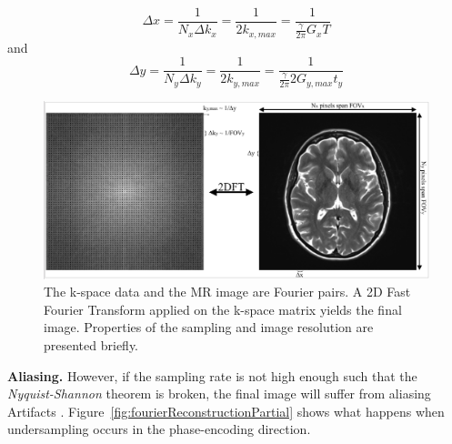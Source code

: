 \begin{equation} \label{eq:1212}
    \Delta x = \frac{1}{N_x \Delta k_x} = \frac{1}{2 k_{x,max}} = \frac{1}{\frac{\gamma}{2 \pi} G_x T}
\end{equation}
and
\begin{equation} \label{eq:1213}
    \Delta y = \frac{1}{N_y \Delta k_y} = \frac{1}{2 k_{y,max}} = \frac{1}{\frac{\gamma}{2 \pi} 2 G_{y,max} t_y}
\end{equation}

\begin{figure}[ht]
    \centering
    \includegraphics[width=1\textwidth,keepaspectratio]{images/mri/fourierReconstruction}
    \caption{The k-space data and the MR image are Fourier pairs. A 2D Fast Fourier Transform applied on the k-space matrix yields the final image. Properties of the sampling and image resolution are presented briefly.}
    \label{fig:fourierReconstruction}
\end{figure}


\hfill

\textbf{Aliasing.} However, if the sampling rate is not high enough such that the \textit{Nyquist-Shannon} theorem is broken, the final image will suffer from aliasing Artifacts \cite{Deshmane2012}. 
Figure~\ref{fig:fourierReconstructionPartial} shows what happens when undersampling occurs in the phase-encoding direction.

